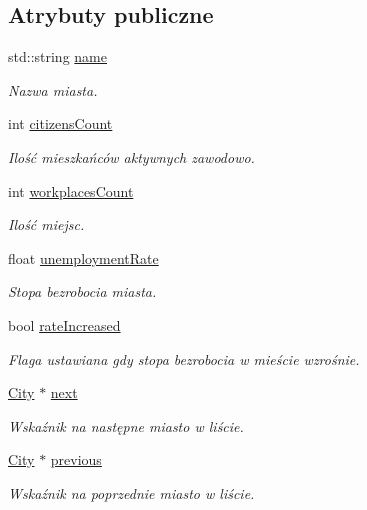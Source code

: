 \subsection*{Atrybuty publiczne}
\begin{DoxyCompactItemize}
\item 
std\+::string \mbox{\hyperlink{struct_city_afea8cd8800a8600fa54af37ac05bf177}{name}}
\begin{DoxyCompactList}\small\item\em Nazwa miasta. \end{DoxyCompactList}\item 
int \mbox{\hyperlink{struct_city_ac801edc1fa726efe7fe245570e6b008c}{citizens\+Count}}
\begin{DoxyCompactList}\small\item\em Ilość mieszkańców aktywnych zawodowo. \end{DoxyCompactList}\item 
int \mbox{\hyperlink{struct_city_a6dcb0f31c0917f9be11c312098c62c23}{workplaces\+Count}}
\begin{DoxyCompactList}\small\item\em Ilość miejsc. \end{DoxyCompactList}\item 
float \mbox{\hyperlink{struct_city_ac6c7ff9b807ec1fd8ed680ec16f90c57}{unemployment\+Rate}}
\begin{DoxyCompactList}\small\item\em Stopa bezrobocia miasta. \end{DoxyCompactList}\item 
bool \mbox{\hyperlink{struct_city_aa5d51ba1e563c1e7d44e977f8a12fa6e}{rate\+Increased}}
\begin{DoxyCompactList}\small\item\em Flaga ustawiana gdy stopa bezrobocia w mieście wzrośnie. \end{DoxyCompactList}\item 
\mbox{\hyperlink{struct_city}{City}} $\ast$ \mbox{\hyperlink{struct_city_a4d954b2bf73bf0532a8b78ad760622b1}{next}}
\begin{DoxyCompactList}\small\item\em Wskaźnik na następne miasto w liście. \end{DoxyCompactList}\item 
\mbox{\hyperlink{struct_city}{City}} $\ast$ \mbox{\hyperlink{struct_city_a6cd07e161d5a616619176d3ace51ed5d}{previous}}
\begin{DoxyCompactList}\small\item\em Wskaźnik na poprzednie miasto w liście. \end{DoxyCompactList}\end{DoxyCompactItemize}


